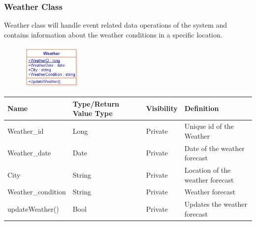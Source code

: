 \subsubsection{Weather Class}
\par Weather class will handle event related data operations of the system and contains information about the weather conditions in a specific location.
\begin{figure}[tbh]
  \begin{center}
  \includegraphics[width=30mm]{weather}
  \end{center}
\end{figure}

\begin{tabular}{|l|l|l|l|}
  \hline
  \textbf{Name} & \textbf{Type/Return Value Type} & \textbf{Visibility} & \textbf{Definition} \\
  \hline
  Weather\_id & Long & Private & Unique id of the Weather \\
  \hline
  Weather\_date & Date & Private & Date of the weather forecast \\
  \hline
  City & String & Private & Location of the weather forecast \\
  \hline
  Weather\_condition & String & Private & Weather forecast \\
  \hline
  updateWeather() & Bool & Private & Updates the weather forecast \\
  \hline
\end{tabular}

